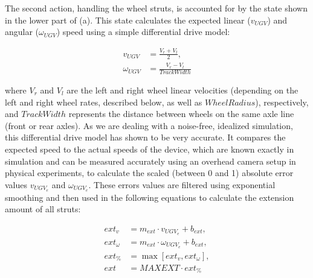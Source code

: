 The second action, handling the wheel struts, is accounted for by the state shown in the lower part of (a).
%
This state calculates the expected linear ($v_{\mathit{UGV}}$) and angular ($\omega_{\mathit{UGV}}$) speed using a simple differential drive model:

\vspace{-0.08in}

\begin{align}
  v_{\mathit{UGV}} &= \frac{V_r + V_l}{2},\\
  \omega_{\mathit{UGV}} &= \frac{V_r - V_l}{\mathit{TrackWidth}}
\end{align}

\noindent
where $V_r$ and $V_l$ are the left and right wheel linear velocities (depending on the left and right wheel rates, described below, as well as $\mathit{WheelRadius}$), respectively, and $\mathit{TrackWidth}$ represents the distance between wheels on the same axle line (front or rear axles).
%
As we are dealing with a noise-free, idealized simulation, this differential drive model has shown to be very accurate.
%
It compares the expected speed to the actual speeds of the device, which are known exactly in simulation and can be measured accurately using an overhead camera setup in physical experiments, to calculate the scaled (between 0 and 1) absolute error values $v_{\mathit{UGV}_e}$ and $\omega_{\mathit{UGV}_e}$.
%
These errors values are filtered using exponential smoothing and then used in the following equations to calculate the extension amount of all struts:

\vspace{-0.2in}

\begin{align}
    \mathit{ext}_v &= m_{\mathit{ext}} \cdot v_{\mathit{UGV}_e} + b_{\mathit{ext}},\\
    \mathit{ext}_\omega &= m_{\mathit{ext}} \cdot \omega_{\mathit{UGV}_e} + b_{\mathit{ext}},\\
    \mathit{ext}_\% &= \max[\mathit{ext}_v, \mathit{ext}_\omega],\\
    \mathit{ext} &= \mathit{MAXEXT} \cdot \mathit{ext}_\%
\end{align}

